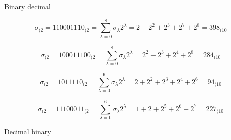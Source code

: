 \documentclass[12pt]{article}
\begin{document}
\pagebreak

Binary \to decimal

\[
	\sigma_{(2} = 110001110_{(2} = \sum_{\lambda = 0}^{8} \sigma_{\lambda} 2^{\lambda} = 2 + 2^{2} + 2^{3} + 2^{7} + 2^{8} = 398_{(10}
\]

\[
	\sigma_{(2} = 100011100_{(2} = \sum_{\lambda = 0}^{8} \sigma_{\lambda} 2^{\lambda} = 2^{2} + 2^{3} + 2^{4} + 2^{8} = 284_{(10}
\]

\[
	\sigma_{(2} = 1011110_{(2} = \sum_{\lambda = 0}^{6} \sigma_{\lambda} 2^{\lambda} = 2 + 2^{2} + 2^{3} + 2^{4} + 2^{6} = 94_{(10}
\]

\[
	\sigma_{(2} = 11100011_{(2} = \sum_{\lambda = 0}^{6} \sigma_{\lambda} 2^{\lambda} = 1 + 2 + 2^{5} + 2^{6} + 2^{7} = 227_{(10}
\]

Decimal \to binary
\end{document}
